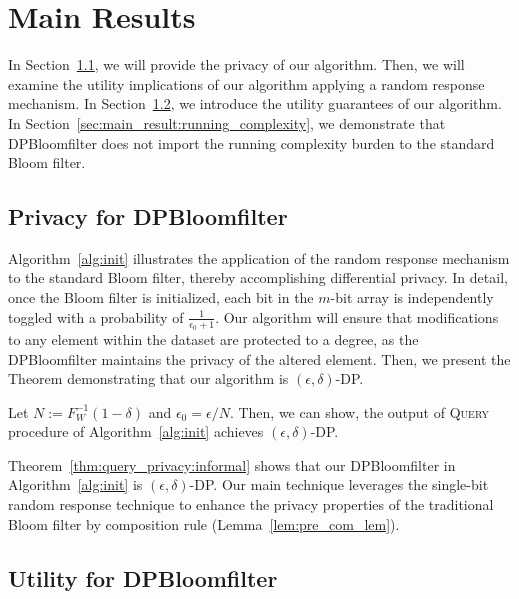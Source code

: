 


\section{Main Results}\label{sec:main_result}


In Section~\ref{sec:mr_privacy}, we will provide the privacy of our algorithm. Then, we will examine the utility implications of our algorithm applying a random response mechanism. 
In Section~\ref{sec:main_result:utility}, we introduce the utility guarantees of our algorithm.
In Section~\ref{sec:main_result:running_complexity}, we demonstrate that DPBloomfilter does not import the running complexity burden to the standard Bloom filter.

\subsection{Privacy for DPBloomfilter}\label{sec:mr_privacy}

Algorithm~\ref{alg:init} illustrates the application of the random response mechanism to the standard Bloom filter, thereby accomplishing differential privacy. In detail, once the Bloom filter is initialized, each bit in the $m$-bit array is independently toggled with a probability of $\frac{1}{\epsilon_0 + 1}$. Our algorithm will ensure that modifications to any element within the dataset are protected to a degree, as the DPBloomfilter maintains the privacy of the altered element. Then, we present the Theorem demonstrating that our algorithm is $(\epsilon,\delta)$-DP.

\begin{theorem}\label{thm:query_privacy:informal}
Let $N := F_W^{-1}(1 - \delta)$ and $\epsilon_0 = \epsilon / N$.
Then, we can show,
the output of \textsc{Query} procedure of Algorithm~\ref{alg:init} achieves $(\epsilon, \delta)$-DP. 
\end{theorem}

Theorem~\ref{thm:query_privacy:informal} shows that our DPBloomfilter in Algorithm~\ref{alg:init} is $(\epsilon, \delta)$-DP. 
Our main technique leverages the single-bit random response technique to enhance the privacy properties of the traditional Bloom filter by composition rule (Lemma~\ref{lem:pre_com_lem}). 

\subsection{Utility for DPBloomfilter}\label{sec:main_result:utility}

